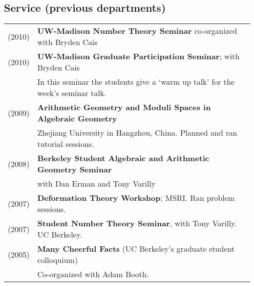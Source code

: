 \documentclass[margin,line]{res}
\begin{document}
\begin{resume}
\section{\sc Service (previous departments)}  
  \begin{tabular}{ll}
    (2010) & \textbf{UW-Madison Number Theory Seminar} co-organized with Bryden Cais\\
    (2010) & \textbf{UW-Madison Graduate Participation Seminar}; with Bryden Cais\\
    & In this seminar the students give a `warm up talk' for the week's seminar talk.\\
    (2009) & \textbf{Arithmetic Geometry and Moduli Spaces in Algebraic Geometry}\\
    & Zhejiang University in Hangzhou, China. Planned and ran tutorial sessions.\\
    (2008) & \textbf{Berkeley Student Algebraic and Arithmetic Geometry Seminar} \\
    & with Dan Erman and Tony Varilly\\
    (2007) & \textbf{Deformation Theory Workshop}; MSRI. Ran problem sessions.\\
    (2007) & \textbf{Student Number Theory Seminar}, with Tony Varilly. UC Berkeley.\\
    (2005) & \textbf{Many Cheerful Facts}  (UC Berkeley's graduate student colloquium)\\
    & Co-organized with Adam Booth. \\
  \end{tabular}


\end{resume}
\end{document}
